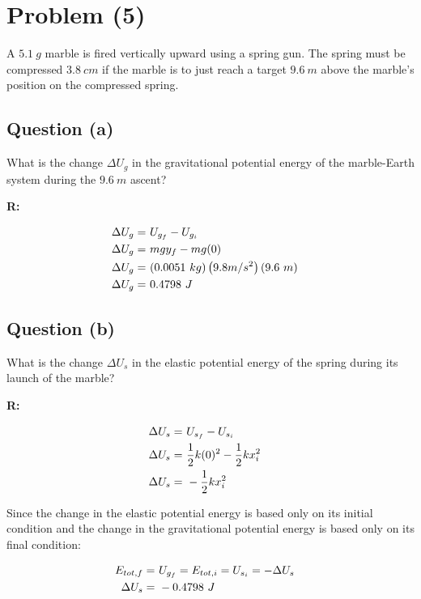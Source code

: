 \section{Problem (5)}
	A $5.1 \ g$ marble is fired vertically upward using a spring gun. The spring must be compressed $3.8 \ cm$ if the marble is to just reach a target $9.6 \ m$ above the marble's position on the compressed spring.

	\subsection{Question (a)}

		What is the change $\Delta U_{g}$ in the gravitational potential energy of the marble-Earth system during the $9.6 \ m$ ascent?

		\textbf{R:}

		\begin{align}
			\Delta U_{g} = \ &U_{g_{f}} - U_{g_{i}}& \notag \\
			\Delta U_{g} = \ &mgy_{f} - mg(0)& \notag \\
			\Delta U_{g} = \ &(0.0051 \ kg)\left(9.8 m/s^{2}\right)(9.6 \ m)& \notag \\
			\Delta U_{g} = \ &0.4798 \ J&
		\end{align}

	\subsection{Question (b)}

		What is the change $\Delta U_{s}$ in the elastic potential energy of the spring during its launch of the marble?

		\textbf{R:}

		\begin{align}
			\Delta U_{s} = \ &U_{s_{f}} - U_{s_{i}}& \notag \\
			\Delta U_{s} = \ &\frac{1}{2}k(0)^{2} - \frac{1}{2}kx_{i}^{2}& \notag \\
			\Delta U_{s} = \ &- \frac{1}{2}kx_{i}^{2}& \notag
		\end{align}

		Since the change in the elastic potential energy is based only on its initial condition and the change in the gravitational potential energy is based only on its final condition:

		\begin{align}
			E_{tot,f} = \ &U_{g_{f}} = E_{tot,i} = U_{s_{i}} = - \Delta U_{s}& \notag \\
			\Delta U_{s} = \ &- 0.4798 \ J&
		\end{align}

